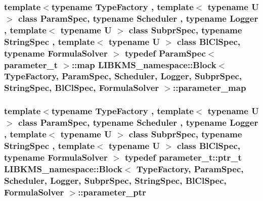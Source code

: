 \hypertarget{classLIBKMS__namespace_1_1Block_a8d67012b101494c21dee73cd82a1e99f}{
\subsubsection[{parameter\-\_\-map}]{\setlength{\rightskip}{0pt plus 5cm}template$<$typename Type\-Factory , template$<$ typename U $>$ class Param\-Spec, typename Scheduler , typename Logger , template$<$ typename U $>$ class Subpr\-Spec, typename String\-Spec , template$<$ typename U $>$ class Bl\-Cl\-Spec, typename Formula\-Solver $>$ typedef Param\-Spec$<$ {\bf parameter\-\_\-t} $>$\-::map {\bf L\-I\-B\-K\-M\-S\-\_\-namespace\-::\-Block}$<$ {\bf Type\-Factory}, Param\-Spec, Scheduler, Logger, Subpr\-Spec, String\-Spec, Bl\-Cl\-Spec, Formula\-Solver $>$\-::{\bf parameter\-\_\-map}}}\label{classLIBKMS__namespace_1_1Block_a8d67012b101494c21dee73cd82a1e99f}
\hypertarget{classLIBKMS__namespace_1_1Block_ac67e65c4f0bd77566768ec64e25382b6}{
\subsubsection[{parameter\-\_\-ptr}]{\setlength{\rightskip}{0pt plus 5cm}template$<$typename Type\-Factory , template$<$ typename U $>$ class Param\-Spec, typename Scheduler , typename Logger , template$<$ typename U $>$ class Subpr\-Spec, typename String\-Spec , template$<$ typename U $>$ class Bl\-Cl\-Spec, typename Formula\-Solver $>$ typedef {\bf parameter\-\_\-t\-::ptr\-\_\-t} {\bf L\-I\-B\-K\-M\-S\-\_\-namespace\-::\-Block}$<$ {\bf Type\-Factory}, Param\-Spec, Scheduler, Logger, Subpr\-Spec, String\-Spec, Bl\-Cl\-Spec, Formula\-Solver $>$\-::{\bf parameter\-\_\-ptr}}}\label{classLIBKMS__namespace_1_1Block_ac67e65c4f0bd77566768ec64e25382b6}
